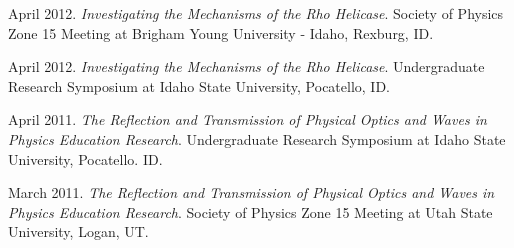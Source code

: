 \begin{etaremune}[topsep=0pt, itemsep=4pt, partopsep=0pt, parsep=0pt]
    \item April 2012. \textit{Investigating the Mechanisms of the Rho Helicase}. Society of Physics Zone 15 Meeting at Brigham Young University - Idaho, Rexburg, ID.
    
    \item April 2012. \textit{Investigating the Mechanisms of the Rho Helicase}. Undergraduate Research Symposium at Idaho State University, Pocatello, ID.
    
    \item April 2011. \textit{The Reflection and Transmission of Physical Optics and Waves in Physics Education Research}. Undergraduate Research Symposium at Idaho State University, Pocatello. ID.
    
    \item March 2011. \textit{The Reflection and Transmission of Physical Optics and Waves in Physics Education Research}. Society of Physics Zone 15 Meeting at Utah State University, Logan, UT.
\end{etaremune}